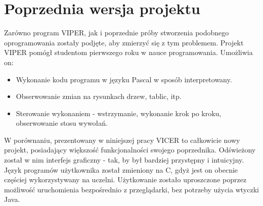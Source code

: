 \documentclass[a4paper,twoside,openright,11pt]{report}
\begin{document}
  \section{Poprzednia wersja projektu}
\par Zarówno program VIPER, jak i poprzednie próby stworzenia podobnego oprogramowania zostały podjęte, aby zmierzyć się z tym problemem. Projekt VIPER pomógł studentom pierwszego roku w nauce programowania. Umożliwia on:
\begin{itemize}

  \item Wykonanie kodu programu w języku Pascal w sposób interpretowany.
  \item Obserwowanie zmian na rysunkach drzew, tablic, itp.
  \item Sterowanie wykonaniem - wstrzymanie, wykonanie krok po kroku, obserwowanie stosu wywołań.

\end{itemize}
 
\par W porównaniu, prezentowany w niniejszej pracy VICER to całkowicie nowy projekt, posiadający większość funkcjonalności swojego poprzednika. Odświeżony został w nim interfejs graficzny - tak, by był bardziej przystępny i intuicyjny. Język programów użytkownika został zmieniony na C, gdyż jest on obecnie częściej wykorzystywany na uczelni. Użytkowanie zostało uproszczone poprzez możliwość uruchomienia bezpośrednio z przeglądarki, bez potrzeby użycia wtyczki Java.
\end{document}
